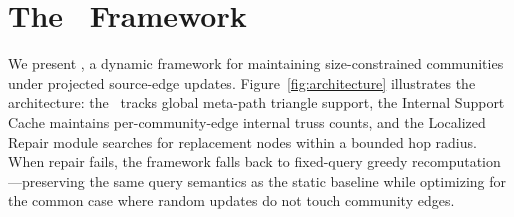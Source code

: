 \section[The DynaSCSH Framework]{The \DynaSCSH\ Framework}

We present \DynaSCSH, a dynamic framework for maintaining size-constrained communities under projected source-edge updates. Figure~\ref{fig:architecture} illustrates the architecture: the \mtindex\ tracks global meta-path triangle support, the Internal Support Cache maintains per-community-edge internal truss counts, and the Localized Repair module searches for replacement nodes within a bounded hop radius. When repair fails, the framework falls back to fixed-query greedy recomputation---preserving the same query semantics as the static baseline while optimizing for the common case where random updates do not touch community edges.

